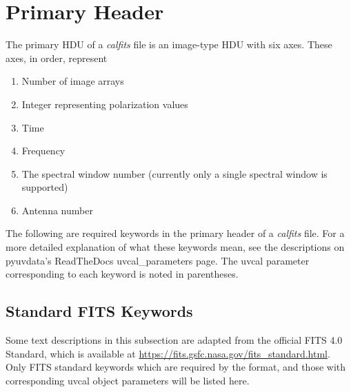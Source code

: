\documentclass[11pt, oneside, english]{article}   	%
\begin{document}
\section{Primary Header}
The primary HDU of a \emph{calfits} file is an image-type HDU with six axes.
These axes, in order, represent 
\begin{enumerate}
	\item{Number of image arrays}
	\item{Integer representing polarization values}
	\item{Time}
	\item{Frequency}
	\item{The spectral window number (currently only a single spectral window is supported)}
	\item{Antenna number}
\end{enumerate}

The following are required keywords in the primary header of a \emph{calfits} file.
For a more detailed explanation of what these keywords mean, see the descriptions on pyuvdata's ReadTheDocs uvcal\_parameters page. The uvcal parameter corresponding to each keyword is noted in parentheses. 
\subsection{Standard FITS Keywords}
Some text descriptions in this subsection are adapted from the official FITS 4.0 Standard, which is available at \url{https://fits.gsfc.nasa.gov/fits_standard.html}.
Only FITS standard keywords which are required by the format, and those with corresponding uvcal object parameters will be listed here.
\end{document}
